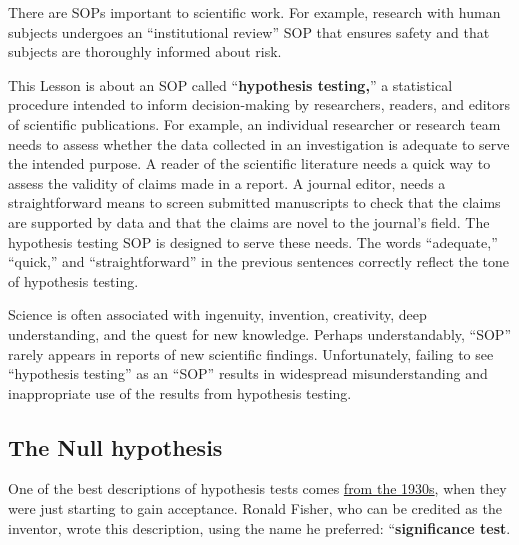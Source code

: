 \documentclass[
  letterpaper,
  DIV=11,
  numbers=noendperiod,
  oneside]{scrartcl}
\begin{document}
There are SOPs important to scientific work. For example, research with
human subjects undergoes an ``institutional review'' SOP that ensures
safety and that subjects are thoroughly informed about risk.

This Lesson is about an SOP called ``\textbf{hypothesis testing,}'' a
statistical procedure intended to inform decision-making by researchers,
readers, and editors of scientific publications. For example, an
individual researcher or research team needs to assess whether the data
collected in an investigation is adequate to serve the intended purpose.
A reader of the scientific literature needs a quick way to assess the
validity of claims made in a report. A journal editor, needs a
straightforward means to screen submitted manuscripts to check that the
claims are supported by data and that the claims are novel to the
journal's field. The hypothesis testing SOP is designed to serve these
needs. The words ``adequate,'' ``quick,'' and ``straightforward'' in the
previous sentences correctly reflect the tone of hypothesis testing.

Science is often associated with ingenuity, invention, creativity, deep
understanding, and the quest for new knowledge. Perhaps understandably,
``SOP'' rarely appears in reports of new scientific findings.
Unfortunately, failing to see ``hypothesis testing'' as an ``SOP''
results in widespread misunderstanding and inappropriate use of the
results from hypothesis testing.

\subsection{The Null hypothesis}\label{sec-the-null-hypothesis}

One of the best descriptions of hypothesis tests comes
\href{https://www.jstor.org/stable/pdf/2844116.pdf}{from the 1930s},
when they were just starting to gain acceptance. Ronald Fisher, who can
be credited as the inventor, wrote this description, using the name he
preferred: ``\textbf{significance test}.
\end{document}

